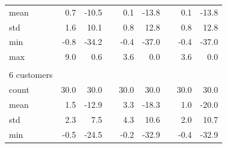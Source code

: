 \begin{longtable}{lrrcrrcrr}
 mean  &                 0.7 &                 -10.5 &&                  0.1 &                  -13.8 &&                  0.1 &                  -13.8 \\
 std   &                 1.6 &                  10.1 &&                  0.8 &                   12.8 &&                  0.8 &                   12.8 \\
 min   &                -0.8 &                 -34.2 &&                 -0.4 &                  -37.0 &&                 -0.4 &                  -37.0 \\
 max   &                 9.0 &                   0.6 &&                  3.6 &                    0.0 &&                  3.6 &                    0.0 \\
 \\
 6 customers\\
 \cmidrule{1-1}
 count &                30.0 &                  30.0 &&                 30.0 &                   30.0 &&                 30.0 &                   30.0 \\
 mean  &                 1.5 &                 -12.9 &&                  3.3 &                  -18.3 &&                  1.0 &                  -20.0 \\
 std   &                 2.3 &                   7.5 &&                  4.3 &                   10.6 &&                  2.0 &                   10.7 \\
 min   &                -0.5 &                 -24.5 &&                 -0.2 &                  -32.9 &&                 -0.4 &                  -32.9 \\

\end{longtable}
